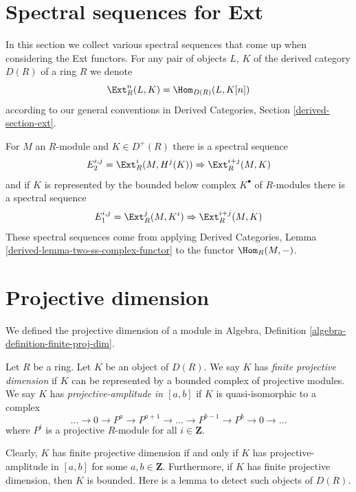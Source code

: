 \section{Spectral sequences for Ext}
\label{section-spectral-sequence-ext}

\noindent
In this section we collect various spectral sequences that come up
when considering the Ext functors. For any pair of objects
$L$, $K$ of the derived category $D(R)$ of a ring $R$
we denote
$$
\Ext^n_R(L, K) = \Hom_{D(R)}(L, K[n])
$$
according to our general conventions in
Derived Categories, Section \ref{derived-section-ext}.

\medskip\noindent
For $M$ an $R$-module and $K \in D^+(R)$ there is a spectral sequence
\begin{equation}
\label{equation-first-ss-ext}
E_2^{i, j} = \Ext_R^i(M, H^j(K)) \Rightarrow \Ext_R^{i + j}(M, K)
\end{equation}
and if $K$ is represented by the bounded below complex $K^\bullet$
of $R$-modules there is a spectral sequence
\begin{equation}
\label{equation-second-ss-ext}
E_1^{i, j} = \Ext_R^j(M, K^i) \Rightarrow \Ext_R^{i + j}(M, K)
\end{equation}
These spectral sequences come from applying
Derived Categories, Lemma \ref{derived-lemma-two-ss-complex-functor}
to the functor $\Hom_R(M, -)$.




\section{Projective dimension}
\label{section-projective-dimension}

\noindent
We defined the projective dimension of a module in
Algebra, Definition \ref{algebra-definition-finite-proj-dim}.

\begin{definition}
\label{definition-projective-dimension}
Let $R$ be a ring. Let $K$ be an object of $D(R)$. We say $K$ has
{\it finite projective dimension} if $K$ can be represented by a
bounded complex of projective modules. We say $K$ has
{\it projective-amplitude in $[a, b]$} if  $K$ is quasi-isomorphic
to a complex
$$
\ldots \to 0 \to P^a \to P^{a + 1} \to \ldots \to
P^{b - 1} \to P^b \to 0 \to \ldots
$$
where $P^i$ is a projective $R$-module for all $i \in \mathbf{Z}$.
\end{definition}

\noindent
Clearly, $K$ has finite projective dimension if and only if $K$
has projective-amplitude in $[a, b]$ for some $a, b \in \mathbf{Z}$.
Furthermore, if $K$ has finite projective dimension, then $K$
is bounded. Here is a lemma to detect such objects of $D(R)$.

